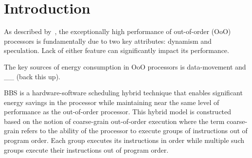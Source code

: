 \section{Introduction} 
\label{sec:intro}

As described by~\cite{mcfarlin2013discerning}, the exceptionally high
performance of out-of-order (OoO) processors is fundamentally due to two key
attributes: dynamism and speculation.  Lack of either feature can significantly
impact its performance. 

The key sources of energy consumption in OoO processors is data-movement and __
(back this up).

BBS is a hardware-software scheduling hybrid technique that enables significant
energy savings in the processor while maintaining near the same level of
performance as the out-of-order processor. This hybrid model is constructed
based on the notion of coarse-grain out-of-order execution where the term
coarse-grain refers to the ability of the processor to execute groups of
instructions out of program order. Each group executes its instructions in order
while multiple such groups execute their instructions out of program order.
